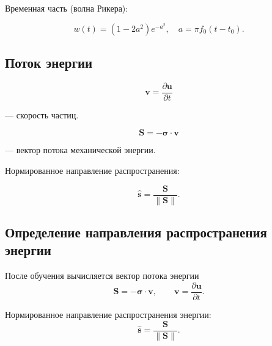 \documentclass[12pt]{article}
\begin{document}
Временная часть (волна Рикера):

\[
w(t)
=
(1-2a^2)e^{-a^2},
\quad
a=\pi f_0 (t-t_0).
\]

\subsection{Поток энергии}

\[
\mathbf{v}
=
\frac{\partial \mathbf{u}}{\partial t}
\]

— скорость частиц.

\[
\mathbf{S}
=
-
\boldsymbol{\sigma}
\cdot
\mathbf{v}
\]

— вектор потока механической энергии.

Нормированное направление распространения:

\[
\hat{\mathbf{s}}
=
\frac{\mathbf{S}}{\|\mathbf{S}\|}.
\]

\subsection{Определение направления распространения энергии}

После обучения вычисляется вектор потока энергии
\begin{equation}
\mathbf{S}
=
- \boldsymbol{\sigma} \cdot \mathbf{v},
\qquad
\mathbf{v}
=
\frac{\partial \mathbf{u}}{\partial t}.
\end{equation}

Нормированное направление распространения энергии:
\begin{equation}
\hat{\mathbf{s}}
=
\frac{\mathbf{S}}{\|\mathbf{S}\|}.
\end{equation}
\end{document}
